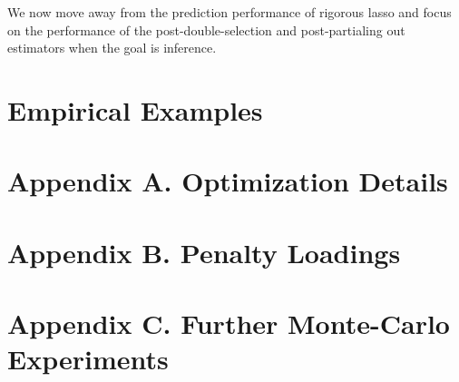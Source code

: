 \documentclass[11pt, reqno]{amsart} \usepackage{pstricks} %
\begin{document}
We now move away from the prediction performance of rigorous lasso and focus on
the performance of the post-double-selection and post-partialing out estimators
when the goal is inference.


\section{Empirical Examples}

\section*{Appendix A. Optimization Details}

\section*{Appendix B. Penalty Loadings}

\section*{Appendix C. Further Monte-Carlo Experiments}



\end{document}
